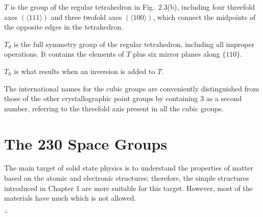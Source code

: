 $T$ is the group of the regular tetrahedron in Fig.~2.3(b), including four threefold axes $(\langle 111\rangle)$ and three twofold axes $(\langle 100\rangle)$, which connect the midpoints of the opposite edges in the tetrahedron.

$T_{d}$ is the full symmetry group of the regular tetrahedron, including all improper operations. It contains the elements of $T$ plus six mirror planes along $\{110\}$.

$T_{h}$ is what results when an inversion is added to $T$.

The international names for the cubic groups are conveniently distinguished from those of the other crystallographic point groups by containing 3 as a second number, referring to the threefold axis present in all the cubic groups.

\section*{The 230 Space Groups}

The main target of solid state physics is to understand the properties of matter based on the atomic and electronic structures; therefore, the simple structures introduced in Chapter 1 are more suitable for this target. However, most of the materials have much which is not allowed. 

$\therefore \ $ 



 



